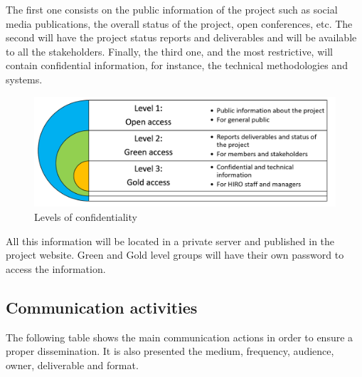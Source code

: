 The first one consists on the public information of the project such as social media publications, the overall status of the project, open conferences, etc. The second will have the project status reports and deliverables and will be available to all the stakeholders. Finally, the third one, and the most restrictive, will contain confidential information, for instance, the technical methodologies and systems.

\begin{figure}[H]
	\centering
	\includegraphics[width=\textwidth]{images/knowledgement.png}
	\caption{Levels of confidentiality} 
	\label{knowledge}
\end{figure}

All this information will be located in a private server and published in the project website. Green and Gold level groups will have their own password to access the information.

\subsection{Communication activities}

The following table shows the main communication actions in order to ensure a proper dissemination. It is also presented the medium, frequency, audience, owner, deliverable and format.

